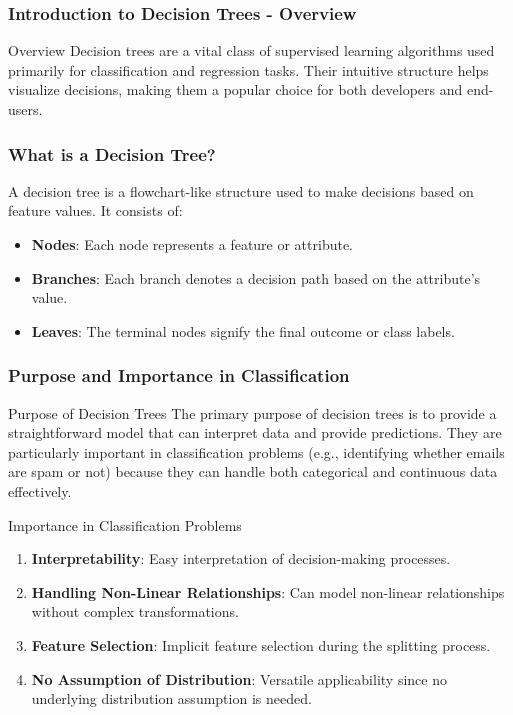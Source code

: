 \documentclass[aspectratio=169]{beamer}
\begin{document}
\frame{\titlepage}

\begin{frame}[fragile]
    \frametitle{Introduction to Decision Trees - Overview}
    \begin{block}{Overview}
        Decision trees are a vital class of supervised learning algorithms used primarily for classification and regression tasks. Their intuitive structure helps visualize decisions, making them a popular choice for both developers and end-users.
    \end{block}
\end{frame}

\begin{frame}[fragile]
    \frametitle{What is a Decision Tree?}
    A decision tree is a flowchart-like structure used to make decisions based on feature values. It consists of:
    \begin{itemize}
        \item \textbf{Nodes}: Each node represents a feature or attribute.
        \item \textbf{Branches}: Each branch denotes a decision path based on the attribute's value.
        \item \textbf{Leaves}: The terminal nodes signify the final outcome or class labels.
    \end{itemize}
\end{frame}

\begin{frame}[fragile]
    \frametitle{Purpose and Importance in Classification}
    \begin{block}{Purpose of Decision Trees}
        The primary purpose of decision trees is to provide a straightforward model that can interpret data and provide predictions. They are particularly important in classification problems (e.g., identifying whether emails are spam or not) because they can handle both categorical and continuous data effectively.
    \end{block}
    
    \begin{block}{Importance in Classification Problems}
        \begin{enumerate}
            \item \textbf{Interpretability}: Easy interpretation of decision-making processes.
            \item \textbf{Handling Non-Linear Relationships}: Can model non-linear relationships without complex transformations.
            \item \textbf{Feature Selection}: Implicit feature selection during the splitting process.
            \item \textbf{No Assumption of Distribution}: Versatile applicability since no underlying distribution assumption is needed.
        \end{enumerate}
    \end{block}
\end{frame}
\end{document}
